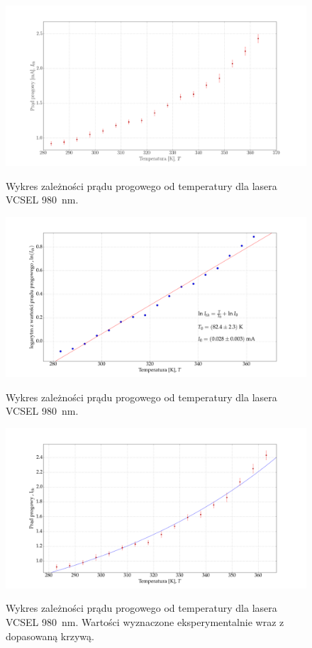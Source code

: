 \documentclass[a4paper, portrait,12pt]{mwrep}
\begin{document}
\begin{figure}
\center
  \includegraphics[scale=0.30]{plot980/plot_temp_i_th_lin.png}
  \label{rys1}
  \caption{Wykres zależności prądu progowego od temperatury dla lasera VCSEL 980\, nm.} 
\end{figure}
\begin{figure}
\center
  \includegraphics[scale=0.30]{plot980/plot_temp_i_th_fit.png}
  \label{rys1}
  \caption{Wykres zależności prądu progowego od temperatury dla lasera VCSEL 980\, nm.} 
\end{figure}
\begin{figure}
\center
  \includegraphics[scale=0.30]{plot980/plot_theory_exp.png}
  \label{rys1}
  \caption{Wykres zależności prądu progowego od temperatury dla lasera VCSEL 980\, nm. Wartości wyznaczone eksperymentalnie wraz z dopasowaną krzywą.} 
\end{figure}
\newpage
\end{document}
